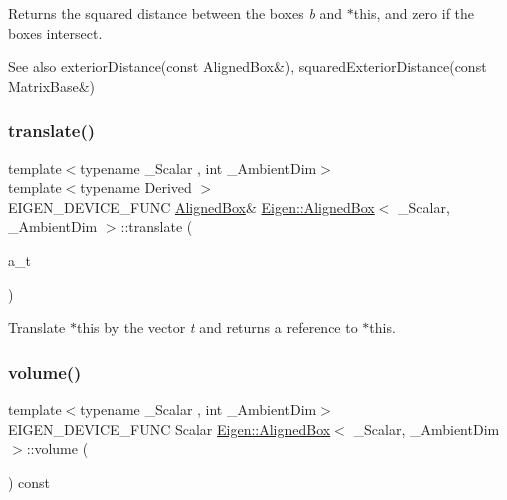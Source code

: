 \begin{DoxyReturn}{Returns}
the squared distance between the boxes {\itshape b} and {\ttfamily $\ast$this}, and zero if the boxes intersect. 
\end{DoxyReturn}
\begin{DoxySeeAlso}{See also}
exterior\+Distance(const Aligned\+Box\&), squared\+Exterior\+Distance(const Matrix\+Base\&) 
\end{DoxySeeAlso}
\mbox{\label{class_eigen_1_1_aligned_box_af869911480769d718514cd008dd191dc}} 
\subsubsection{\texorpdfstring{translate()}{translate()}}
{\footnotesize\ttfamily template$<$typename \+\_\+\+Scalar , int \+\_\+\+Ambient\+Dim$>$ \\
template$<$typename Derived $>$ \\
E\+I\+G\+E\+N\+\_\+\+D\+E\+V\+I\+C\+E\+\_\+\+F\+U\+NC \mbox{\hyperlink{class_eigen_1_1_aligned_box}{Aligned\+Box}}\& \mbox{\hyperlink{class_eigen_1_1_aligned_box}{Eigen\+::\+Aligned\+Box}}$<$ \+\_\+\+Scalar, \+\_\+\+Ambient\+Dim $>$\+::translate (\begin{DoxyParamCaption}\item[{const \mbox{\hyperlink{class_eigen_1_1_matrix_base}{Matrix\+Base}}$<$ Derived $>$ \&}]{a\+\_\+t }\end{DoxyParamCaption})\hspace{0.3cm}{\ttfamily [inline]}}

Translate {\ttfamily $\ast$this} by the vector {\itshape t} and returns a reference to {\ttfamily $\ast$this}. \mbox{\label{class_eigen_1_1_aligned_box_af737027346c35a1c3027d36c9c891dc5}} 
\subsubsection{\texorpdfstring{volume()}{volume()}}
{\footnotesize\ttfamily template$<$typename \+\_\+\+Scalar , int \+\_\+\+Ambient\+Dim$>$ \\
E\+I\+G\+E\+N\+\_\+\+D\+E\+V\+I\+C\+E\+\_\+\+F\+U\+NC Scalar \mbox{\hyperlink{class_eigen_1_1_aligned_box}{Eigen\+::\+Aligned\+Box}}$<$ \+\_\+\+Scalar, \+\_\+\+Ambient\+Dim $>$\+::volume (\begin{DoxyParamCaption}{ }\end{DoxyParamCaption}) const\hspace{0.3cm}{\ttfamily [inline]}}

